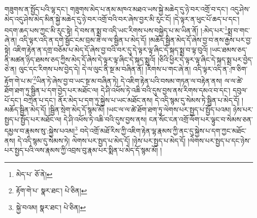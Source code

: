 གཟུགས་ན་སྤྱོད་པའི་ལྷ་དང་། གཟུགས་མེད་པ་ནམ་མཁའ་མཐའ་ཡས་སྐྱེ་མཆེད་དུ་ཉེ་བར་འགྲོ་བ་དང་། འདུ་ཤེས་མེད་འདུ་ཤེས་མེད་མིན་སྐྱེ་མཆེད་དུ་ཉེ་བར་འགྲོ་བའི་བར་ཞེས་བྱར་མི་རུང་ངོ། །དེ་ལྟར་ན་ཕུང་པོ་ཆད་པ་དང་། བདག་ཆད་པས་ཀྱང་མི་རུང་སྟེ། དེ་བས་ན་སྨྲ་བ་འདི་ཡང་རིགས་པས་བསྐྱེད་པ་མ་ཡིན་ནོ། །:མེད་པར་\footnote{མེད་པ་  ཅོ་ནེ། }སྨྲ་བ་གང་ཞེ་ན། འདི་ལྟར་འདི་ན་དགེ་སྦྱོང་ངམ་བྲམ་ཟེ་ལ་ལ་སྦྱིན་པ་མེད་དོ། །མཆོད་སྦྱིན་མེད་དོ་ཞེས་བྱ་བ་ནས་རྒྱས་པར་བྱ་སྟེ། འཇིག་རྟེན་ན་དགྲ་བཅོམ་པ་མེད་དོ་ཞེས་བྱ་བའི་བར་དུ་དེ་ལྟར་ལྟ་ཞིང་དེ་སྐད་སྨྲ་བ་ལྟ་བུའོ། །ཡང་ཐམས་ཅད་ནི་མཚན་ཉིད་ཐམས་ཅད་ཀྱིས་མེད་དོ་ཞེས་དེ་ལྟར་ལྟ་ཞིང་དེ་སྐད་སྨྲའོ། །ཅིའི་ཕྱིར་དེ་ལྟར་ལྟ་ཞིང་དེ་སྐད་སྨྲ་པར་བྱེད་ཅེ་ན། ལུང་དང་རིགས་པས་བྱེད་དེ། དེ་ལ་ལུང་ནི་སྔ་མ་བཞིན་ནོ། །རིགས་པ་གང་ཞེ་ན། འདི་ལྟར་འདི་ན་:ཁ་ཅིག་རྟོག་གེ་པ་མ་\footnote{རྟོག་གེ་པ་  སྣར་ཐང་།  པེ་ཅིན། }ཡིན་ཏེ་ཞེས་བྱ་བ་ཡང་སྔ་མ་བཞིན་ཏེ། དེ་འཇིག་རྟེན་པའི་བསམ་གཏན་ལ་བརྟེན་ནས། ལ་ལ་ཚེ་ཐོག་ཐག་ཏུ་སྦྱིན་པ་དག་བྱེད་པར་མཐོང་ལ། དེ་ཤི་འཕོས་ཏེ་འཆི་བའི་དུས་བྱས་ནས་རིགས་དམའ་བ་དང་། དབུལ་པོ་དང་། བཀྲེན་པ་དང་། ནོར་མེད་པ་དག་ཏུ་སྐྱེས་པ་ཡང་མཐོང་ནས། དེ་འདི་སྙམ་དུ་སེམས་ཏེ་སྦྱིན་པ་མེད་དོ། །མཆོད་སྦྱིན་མེད་དོ། །སྦྱིན་སྲེག་མེད་དོ་སྙམ་མོ། །ཡང་ལ་ལ་ཚེ་ཐོག་ཐག་ཏུ་ལེགས་པར་སྤྱད་པ་སྤྱོད་པའམ། ཉེས་པར་སྤྱད་པ་སྤྱོད་པར་མཐོང་ལ། དེ་ཤི་འཕོས་ཏེ་འཆི་བའི་དུས་བྱས་ནས། ངན་སོང་ངན་འགྲོ་ལོག་པར་ལྟུང་བ་སེམས་ཅན་དམྱལ་བ་རྣམས་སུ་:སྐྱེས་པའམ།\footnote{སྐྱེ་བའམ།  སྣར་ཐང་།  པེ་ཅིན། } བདེ་འགྲོ་མཐོ་རིས་ཀྱི་འཇིག་རྟེན་ལྷ་རྣམས་ཀྱི་ནང་དུ་སྐྱེས་པ་དག་ཀྱང་མཐོང་ནས། དེ་འདི་སྙམ་དུ་སེམས་ཏེ། ལེགས་པར་སྤྱད་པ་མེད་དོ། །ཉེས་པར་སྤྱད་པ་མེད་དོ། །ལེགས་པར་སྤྱད་པ་དང་ཉེས་པར་སྤྱད་པའི་ལས་རྣམས་ཀྱི་འབྲས་བུ་རྣམ་པར་སྨིན་པ་མེད་དོ་སྙམ་མོ། །
